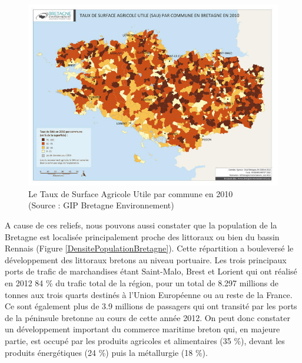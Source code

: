 \documentclass[a4paper,12pt]{report}
\begin{document}
			\begin{figure}[!h]
			\centering
			\includegraphics[width=17cm]{Illustrations/SAUParCommune.jpg}
			\caption{Le Taux de Surface Agricole Utile par commune en 2010\\(Source : GIP Bretagne Environnement\cite{BretagneEnvironnement})}
			\label{SAUParCommune}
			\end{figure}
			
			A cause de ces reliefs, nous pouvons aussi constater que la population de la Bretagne est localisée principalement proche des littoraux ou bien du bassin Rennais (Figure \ref{DensitePopulationBretagne}). Cette répartition a bouleversé le développement des littoraux bretons au niveau portuaire. Les trois principaux ports de trafic de marchandises étant Saint-Malo, Brest et Lorient qui ont réalisé en 2012 84 \% du trafic total de la région, pour un total de 8.297 millions de tonnes aux trois quarts destinés à l’Union Européenne ou au reste de la France. Ce sont également plus de 3.9 millions de passagers qui ont transité par les ports de la péninsule bretonne au cours de cette année 2012\cite{CommerceMaritimeBretagne}. On peut donc constater un développement important du commerce maritime breton qui, en majeure partie, est occupé par les produits agricoles et alimentaires (35 \%), devant les produits énergétiques (24 \%) puis la métallurgie (18 \%).
			
\end{document}
